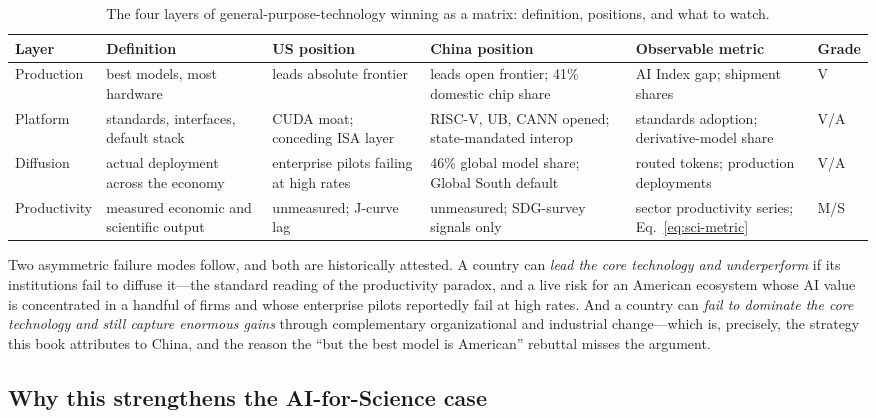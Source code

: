 \begin{table}[htbp]
  \centering
  \scriptsize
  \caption{The four layers of general-purpose-technology winning as a matrix: definition, positions, and what to watch.}
  \label{tab:gpt-matrix}
  \setlength{\tabcolsep}{3.5pt}
  \begin{tabular}{p{20mm}p{34mm}p{26mm}p{28mm}p{28mm}p{9mm}}
    \toprule
    Layer & Definition & US position & China position & Observable metric & Grade \\
    \midrule
    Production & best models, most hardware & leads absolute frontier & leads open frontier; 41\% domestic chip share & AI Index gap; shipment shares & V \\
    \addlinespace
    Platform & standards, interfaces, default stack & CUDA moat; conceding ISA layer & RISC-V, UB, CANN opened; state-mandated interop & standards adoption; derivative-model share & V/A \\
    \addlinespace
    Diffusion & actual deployment across the economy & enterprise pilots failing at high rates & 46\% global model share; Global South default & routed tokens; production deployments & V/A \\
    \addlinespace
    Productivity & measured economic and scientific output & unmeasured; J-curve lag & unmeasured; SDG-survey signals only & sector productivity series; Eq.~\ref{eq:sci-metric} & M/S \\
    \bottomrule
  \end{tabular}
\end{table}

Two asymmetric failure modes follow, and both are historically attested. A country can \emph{lead the core technology and underperform} if its institutions fail to diffuse it---the standard reading of the productivity paradox, and a live risk for an American ecosystem whose AI value is concentrated in a handful of firms and whose enterprise pilots reportedly fail at high rates. And a country can \emph{fail to dominate the core technology and still capture enormous gains} through complementary organizational and industrial change---which is, precisely, the strategy this book attributes to China, and the reason the ``but the best model is American'' rebuttal misses the argument.

\subsection{Why this strengthens the AI-for-Science case}

